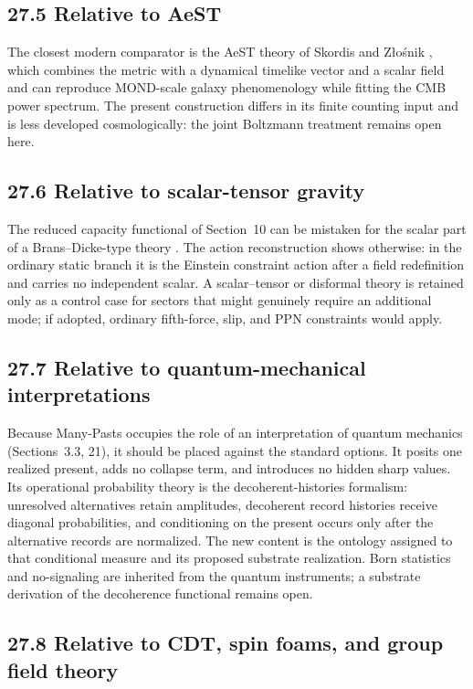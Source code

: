 \documentclass[11pt]{article}
\begin{document}
\subsection{27.5 Relative to AeST}

The closest modern comparator is the AeST theory of Skordis and Z\l{}o\'snik \citep{Skordis2021}, which combines the metric with a dynamical timelike vector and a scalar field and can reproduce MOND-scale galaxy phenomenology while fitting the CMB power spectrum. The present construction differs in its finite counting input and is less developed cosmologically: the joint Boltzmann treatment remains open here.

\subsection{27.6 Relative to scalar-tensor gravity}

The reduced capacity functional of Section~10 can be mistaken for the scalar part of a Brans--Dicke-type theory \citep{BransDicke1961}. The action reconstruction shows otherwise: in the ordinary static branch it is the Einstein constraint action after a field redefinition and carries no independent scalar. A scalar--tensor or disformal theory is retained only as a control case for sectors that might genuinely require an additional mode; if adopted, ordinary fifth-force, slip, and PPN constraints would apply.

\subsection{27.7 Relative to quantum-mechanical interpretations}

Because Many-Pasts occupies the role of an interpretation of quantum mechanics (Sections~3.3, 21), it should be placed against the standard options. It posits one realized present, adds no collapse term, and introduces no hidden sharp values. Its operational probability theory is the decoherent-histories formalism: unresolved alternatives retain amplitudes, decoherent record histories receive diagonal probabilities, and conditioning on the present occurs only after the alternative records are normalized. The new content is the ontology assigned to that conditional measure and its proposed substrate realization. Born statistics and no-signaling are inherited from the quantum instruments; a substrate derivation of the decoherence functional remains open.

\subsection{27.8 Relative to CDT, spin foams, and group field theory}
\end{document}
